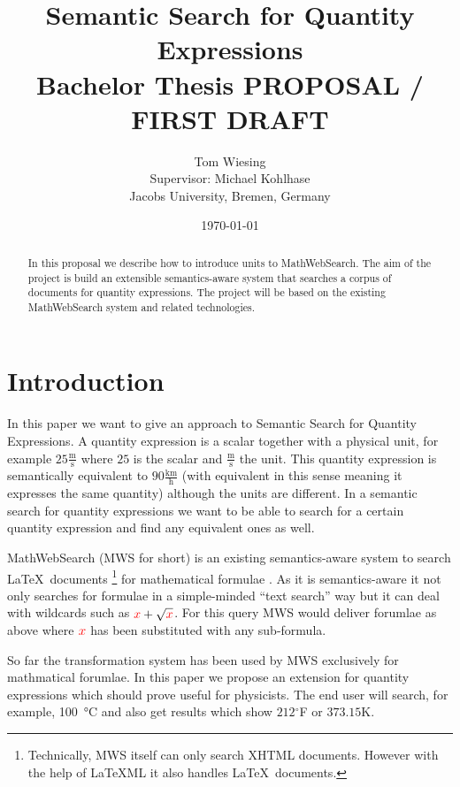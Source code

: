 \documentclass[11pt]{article}
\title{Semantic Search for Quantity Expressions\\ \vspace{2 mm} Bachelor Thesis PROPOSAL / FIRST DRAFT\ednote{Remove draft status}}
\author{Tom Wiesing\\Supervisor: Michael Kohlhase\\Jacobs University, Bremen, Germany}
\date{\today}
\begin{document}
\maketitle
{}

\begin{abstract}
  In this proposal we describe how to introduce units to MathWebSearch. The aim of the project is build an extensible semantics-aware system that searches a corpus of documents for quantity expressions. The project will be based on the existing MathWebSearch system and related technologies. 
\end{abstract}

\tableofcontents

\section{Introduction}

In this paper we want to give an approach to Semantic Search for Quantity Expressions. A quantity expression is a scalar together with a physical unit, for example $25 \frac{\text{m}}{\text{s}}$ where $25$ is the scalar and $\frac{\text{m}}{\text{s}}$ the unit. This quantity expression is semantically equivalent to $90 \frac{\text{km}}{\text{h}}$ (with equivalent in this sense meaning it expresses the same quantity) although the units are different. In a semantic search for quantity expressions we want to be able to search for a certain quantity expression and find any equivalent ones as well.

MathWebSearch (MWS for short) is an existing semantics-aware system to search \LaTeX \  documents \footnote{Technically, MWS itself can only search XHTML documents. However with the help of \LaTeX{}ML \cite{Miller:latexml:base} it also handles \LaTeX \ documents. } for mathematical formulae \cite{HamKohPro:man14}. As it is semantics-aware it not only searches for formulae in a simple-minded ``text search'' way but it can deal with wildcards such as $ { \color{red} x} + \sqrt{\color{red} x}$. For this query MWS would deliver forumlae as above where $ { \color{red} x} $ has been substituted with any sub-formula.

So far the transformation system has been used by MWS exclusively for mathmatical forumlae. In this paper we propose an extension for quantity expressions which should prove useful for physicists.
The end user will search, for example, \SI{100}{\degreeCelsius} and also get results which show $212$$^\circ$F or $373.15$K.
\end{document}

